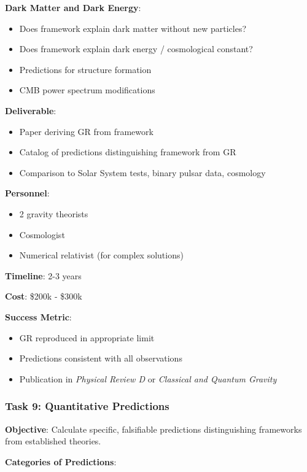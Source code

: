 \textbf{Dark Matter and Dark Energy}:
\begin{itemize}
    \item Does framework explain dark matter without new particles?
    \item Does framework explain dark energy / cosmological constant?
    \item Predictions for structure formation
    \item CMB power spectrum modifications
\end{itemize}

\textbf{Deliverable}:
\begin{itemize}
    \item Paper deriving GR from framework
    \item Catalog of predictions distinguishing framework from GR
    \item Comparison to Solar System tests, binary pulsar data, cosmology
\end{itemize}

\textbf{Personnel}:
\begin{itemize}
    \item 2 gravity theorists
    \item Cosmologist
    \item Numerical relativist (for complex solutions)
\end{itemize}

\textbf{Timeline}: 2-3 years

\textbf{Cost}: \$200k - \$300k

\textbf{Success Metric}:
\begin{itemize}
    \item GR reproduced in appropriate limit
    \item Predictions consistent with all observations
    \item Publication in \textit{Physical Review D} or \textit{Classical and Quantum Gravity}
\end{itemize}

\subsubsection{Task 9: Quantitative Predictions}

\textbf{Objective}: Calculate specific, falsifiable predictions distinguishing frameworks from established theories.

\textbf{Categories of Predictions}:

